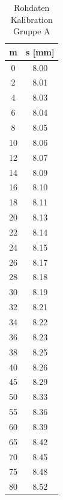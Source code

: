 \documentclass[12pt,a4paper]{article}
\begin{document}
\begin{table}
	\begin{minipage}{0.5\textwidth}
		\centering
		\begin{tabular}{|c|c|}
			\hline
			m & s [mm] \\
			\hline
			0 & 8.00 \\
			\hline
			2 & 8.01 \\
			\hline
			4 & 8.03 \\
			\hline
			6 & 8.04 \\
			\hline
			8 & 8.05 \\
			\hline
			10 & 8.06 \\
			\hline
			12 & 8.07 \\
			\hline
			14 & 8.09 \\
			\hline
			16 & 8.10 \\
			\hline
			18 & 8.11 \\
			\hline
			20 & 8.13 \\
			\hline
			22 & 8.14 \\
			\hline
			24 & 8.15 \\
			\hline
			26 & 8.17 \\
			\hline
			28 & 8.18 \\
			\hline
			30 & 8.19 \\
			\hline
			32 & 8.21 \\
			\hline
			34 & 8.22 \\
			\hline
			36 & 8.23 \\
			\hline
			38 & 8.25 \\
			\hline
			40 & 8.26 \\
			\hline
			45 & 8.29 \\
			\hline
			50 & 8.33 \\
			\hline
			55 & 8.36 \\
			\hline
			60 & 8.39 \\
			\hline
			65 & 8.42 \\
			\hline
			70 & 8.45 \\
			\hline
			75 & 8.48 \\
			\hline
			80 & 8.52 \\
			\hline
		\end{tabular}
		\caption{Rohdaten Kalibration Gruppe A}
		\label{tab:kali_A}
		

\end{minipage}
\end{table}
\end{document}

